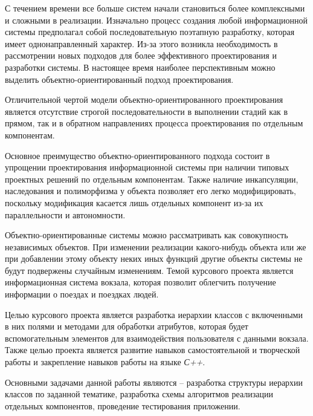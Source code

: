 
С течением времени все больше систем начали становиться более комплексными и сложными в реализации. Изначально процесс создания любой информационной системы предполагал собой последовательную поэтапную разработку, которая имеет однонаправленный характер. Из-за этого возникла необходимость в рассмотрении новых подходов для более эффективного проектирования и разработки системы. В настоящее время наиболее перспективным можно выделить объектно-ориентированный подход проектирования. 

Отличительной чертой модели объектно-ориентированного проектирования является отсутствие строгой последовательности в выполнении стадий как в прямом, так и в обратном направлениях процесса проектирования по отдельным компонентам.

Основное преимущество объектно-ориентированного подхода состоит в упрощении проектирования информационной системы при наличии типовых проектных решений по отдельным компонентам. Также наличие инкапсуляции, наследования и полиморфизма у объекта позволяет его легко модифицировать, поскольку модификация касается лишь отдельных компонент из-за их параллельности и автономности. 

Объектно-ориентированные системы можно рассматривать как совокупность независимых объектов. При изменении реализации какого-нибудь объекта или же при добавлении этому объекту неких иных функций другие объекты системы не будут подвержены случайным изменениям. Темой курсового проекта является информационная система вокзала, которая позволит облегчить получение информации о поездах и поездках людей.

Целью курсового проекта является разработка иерархии классов с включенными в них полями и методами для обработки атрибутов, которая будет вспомогательным элементов для взаимодействия пользователя с данными вокзала. Также целью проекта является развитие навыков самостоятельной и творческой работы и закрепление навыков работы на языке \textit{С++}.

Основными задачами данной работы являются – разработка структуры иерархии классов по заданной тематике, разработка схемы алгоритмов реализации отдельных компонентов, проведение тестирования приложении.